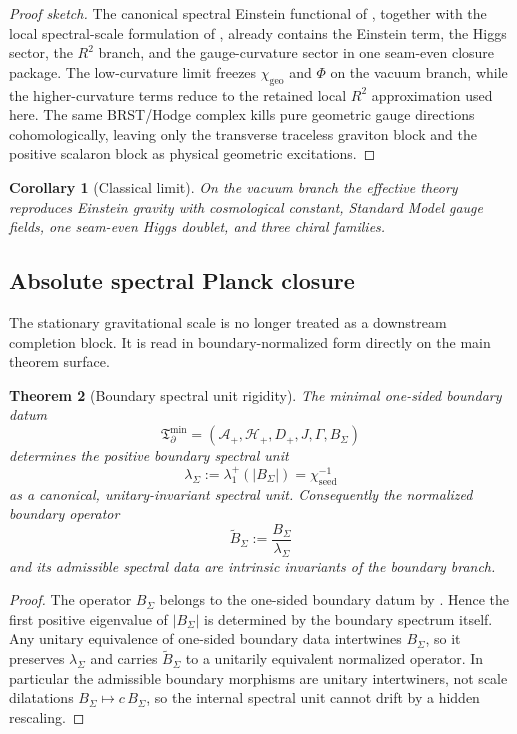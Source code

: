 \documentclass[11pt,a4paper]{article}
\newtheorem{theorem}{Theorem}[section]
\newtheorem{corollary}[theorem]{Corollary}
\theoremstyle{definition}
\theoremstyle{remark}
\newcommand{\Tbound}{\mathfrak T_{\partial}^{\min}}
\newcommand{\chiseed}{\chi_{\mathrm{seed}}}
\newcommand{\chigeo}{\chi_{\mathrm{geo}}}
\begin{document}
\begin{proof}[Proof sketch]
The canonical spectral Einstein functional of
, together with the local
spectral-scale formulation of , already contains the Einstein
term, the Higgs sector, the $R^2$ branch, and the gauge-curvature sector in one seam-even closure
package. The low-curvature limit freezes $\chigeo$ and $\Phi$ on the vacuum branch, while the
higher-curvature terms reduce to the retained local $R^2$ approximation used here. The same
BRST/Hodge complex kills pure geometric gauge directions cohomologically, leaving only the
transverse traceless graviton block and the positive scalaron block as physical geometric
excitations.
\end{proof}

\begin{corollary}[Classical limit]
On the vacuum branch the effective theory reproduces Einstein gravity with cosmological constant, Standard Model gauge fields, one seam-even Higgs doublet, and three chiral families.
\end{corollary}

\subsection{Absolute spectral Planck closure}

The stationary gravitational scale is no longer treated as a downstream completion block. It is read
in boundary-normalized form directly on the main theorem surface.

\begin{theorem}[Boundary spectral unit rigidity]
\label{thm:boundary-spectral-unit-rigidity}
The minimal one-sided boundary datum
\[
\Tbound=(\mathcal A_+,\mathcal H_+,D_+,J,\Gamma,B_\Sigma)
\]
determines the positive boundary spectral unit
\[
\lambda_\Sigma:=\lambda_1^+(|B_\Sigma|)=\chiseed^{-1}
\]
as a canonical, unitary-invariant spectral unit. Consequently the normalized boundary operator
\[
\widetilde B_\Sigma:=\frac{B_\Sigma}{\lambda_\Sigma}
\]
and its admissible spectral data are intrinsic invariants of the boundary branch.
\end{theorem}

\begin{proof}
The operator $B_\Sigma$ belongs to the one-sided boundary datum by
. Hence the first positive eigenvalue of $|B_\Sigma|$ is determined
by the boundary spectrum itself. Any unitary equivalence of one-sided boundary data intertwines
$B_\Sigma$, so it preserves $\lambda_\Sigma$ and carries $\widetilde B_\Sigma$ to a unitarily
equivalent normalized operator. In particular the admissible boundary morphisms are unitary
intertwiners, not scale dilatations $B_\Sigma\mapsto c\,B_\Sigma$, so the internal spectral unit
cannot drift by a hidden rescaling.
\end{proof}
\end{document}
